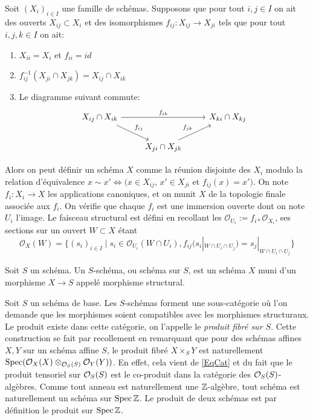 \begin{cons}\label{gluevar}
Soit $(X_i)_{i\in I}$ une famille de schémas. Supposons que pour tout $i,j\in I$ on ait des ouverts $X_{ij}\subset X_i$ et des isomorphismes $f_{ij}:X_{ij}\rightarrow X_{ji}$ tels que pour tout $i,j,k\in I$ on ait:
	\begin{enumerate}
	\item $X_{ii}=X_i$ et $f_{ii}=id$
	\item $f_{ij}^{-1}(X_{ji} \cap X_{jk}) =  X_{ij} \cap X_{ik}$
	\item Le diagramme suivant commute:
	$$
		\begin{tikzcd}
		  X_{ij}\cap X_{ik} \arrow[rd, "f_{ij}"] \arrow[rr, "f_{ik}"] & & X_{ki}\cap X_{kj}\\
  		 & X_{ji}\cap X_{jk} \arrow[ru, "f_{jk}"] &
	\end{tikzcd}
	$$
	\end{enumerate}
Alors on peut définir un schéma $X$ comme la réunion disjointe des $X_i$ modulo la relation d'équivalence $x\sim x' \iff (x\in X_{ij},\, x'\in X_{ji}$ et $f_{ij}(x)=x')$. On note $f_i:X_i\rightarrow X$ les applications canoniques, et on munit 
$X$ de la topologie finale associée aux $f_i$. On vérifie que chaque $f_i$ est une immersion ouverte dont on note $U_i$ l'image. Le faisceau structural est défini en recollant les $\mathcal{O}_{U_i}:=f_{i*}\mathcal{O}_{X_i}$, ses sections sur un ouvert $W\subset X$ étant $$
\mathcal{O}_X(W) =
\{
(s_i)_{i \in I} \mid
s_i \in \mathcal{O}_{U_i}(W \cap U_i),
f_{ij}(s_i|_{W \cap U_i \cap U_j}) = s_j|_{W \cap U_i \cap U_j}
\}
$$
\end{cons}


\begin{defn}
Soit $S$ un schéma. Un $S$-schéma, ou schéma sur $S$, est un schéma $X$ muni d'un morphisme $X\rightarrow S$ appelé morphisme structural.
\end{defn}

Soit $S$ un schéma de base. Les $S$-schémas forment une sous-catégorie où l'on demande que les morphismes soient compatibles avec les morphismes structuraux. Le produit existe dans cette catégorie, on l'appelle le \textit{produit fibré sur $S$}. Cette construction se fait par recollement en remarquant que pour des schémas affines $X,Y$ sur un schéma affine $S$, le produit fibré $X\times_S Y$ est naturellement $\operatorname{Spec} (\mathcal{O}_X(X)\otimes_{\mathcal{O}_S(S)}\mathcal{O}_Y(Y))$. En effet, cela vient de \ref{EqCat} et du fait que le produit tensoriel sur $\mathcal{O}_S(S)$ est le co-produit dans la catégorie des $\mathcal{O}_S(S)$-algèbres. 
Comme tout anneau est naturellement une $\mathbb{Z}$-algèbre, tout schéma est naturellement un schéma sur $\operatorname{Spec} \mathbb{Z}$. Le produit de deux schémas est par définition le produit sur $\operatorname{Spec} \mathbb{Z}$.

